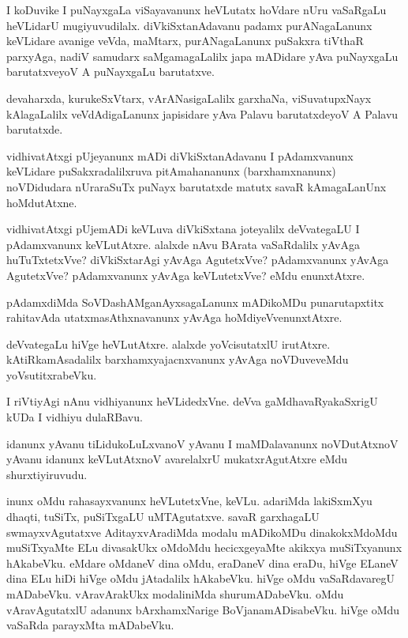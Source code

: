 \begin{mng}
I koDuvike I puNayxgaLa viSayavanunx heVLutatx hoVdare nUru vaSaRgaLu heVLidarU mugiyuvudilalx. diVkiSxtanAdavanu padamx purANagaLanunx keVLidare avanige veVda, maMtarx, purANagaLanunx puSakxra tiVthaR parxyAga, nadiV samudarx saMgamagaLalilx japa mADidare yAva puNayxgaLu barutatxveyoV A puNayxgaLu barutatxve.
\end{mng}

\begin{mng}
devaharxda, kurukeSxVtarx, vArANasigaLalilx garxhaNa, viSuvatupxNayx kAlagaLalilx veVdAdigaLanunx japisidare yAva Palavu barutatxdeyoV A Palavu barutatxde.
\end{mng}

\begin{mng}
vidhivatAtxgi pUjeyanunx mADi diVkiSxtanAdavanu I pAdamxvanunx keVLidare puSakxradalilxruva pitAmahananunx (barxhamxnanunx) noVDidudara nUraraSuTx puNayx barutatxde matutx savaR kAmagaLanUnx hoMdutAtxne.
\end{mng}

\begin{mng}
vidhivatAtxgi pUjemADi keVLuva diVkiSxtana joteyalilx deVvategaLU I pAdamxvanunx keVLutAtxre. alalxde nAvu BArata vaSaRdalilx yAvAga huTuTxtetxVve? diVkiSxtarAgi yAvAga AgutetxVve? pAdamxvanunx yAvAga AgutetxVve? pAdamxvanunx yAvAga keVLutetxVve? eMdu enunxtAtxre.
\end{mng}

\begin{mng}
pAdamxdiMda SoVDashAMganAyxsagaLanunx mADikoMDu punarutapxtitx rahitavAda utatxmasAthxnavanunx yAvAga hoMdiyeVvenunxtAtxre.
\end{mng}

\begin{mng}
deVvategaLu hiVge heVLutAtxre. alalxde yoVcisutatxlU irutAtxre. kAtiRkamAsadalilx barxhamxyajacnxvanunx yAvAga noVDuveveMdu yoVsutitxrabeVku.
\end{mng}

\begin{mng}
I riVtiyAgi nAnu vidhiyanunx heVLidedxVne. deVva gaMdhavaRyakaSxrigU kUDa I vidhiyu dulaRBavu.
\end{mng}

\begin{mng}
idanunx yAvanu tiLidukoLuLxvanoV yAvanu I maMDalavanunx noVDutAtxnoV yAvanu idanunx keVLutAtxnoV avarelalxrU mukatxrAgutAtxre eMdu shurxtiyiruvudu.
\end{mng}

\begin{mng}
inunx oMdu rahasayxvanunx heVLutetxVne, keVLu. adariMda lakiSxmXyu dhaqti, tuSiTx, puSiTxgaLU uMTAgutatxve. savaR garxhagaLU swmayxvAgutatxve AditayxvAradiMda modalu mADikoMDu dinakokxMdoMdu muSiTxyaMte ELu divasakUkx oMdoMdu hecicxgeyaMte akikxya muSiTxyanunx hAkabeVku. eMdare oMdaneV dina oMdu, eraDaneV dina eraDu, hiVge ELaneV dina ELu hiDi hiVge oMdu jAtadalilx hAkabeVku. hiVge oMdu vaSaRdavaregU mADabeVku. vAravArakUkx modaliniMda shurumADabeVku. oMdu vAravAgutatxlU adanunx bArxhamxNarige BoVjanamADisabeVku. hiVge oMdu vaSaRda parayxMta mADabeVku.
\end{mng}

